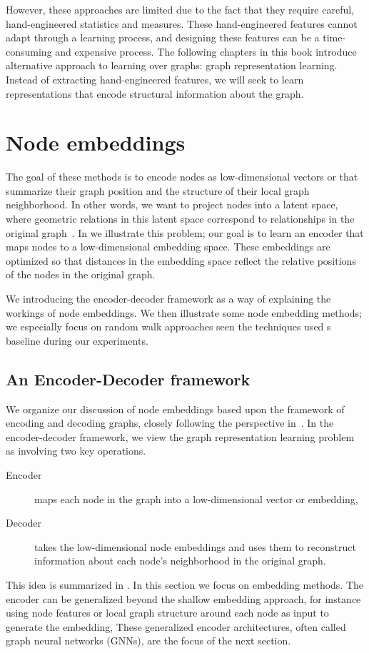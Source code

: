 However, these approaches are limited due to the fact that they require careful, hand-engineered statistics and measures. These hand-engineered features cannot adapt through a learning process, and designing these features can be a time-consuming and expensive process. The following chapters in this book introduce alternative approach to learning over graphs: graph representation learning. Instead of extracting hand-engineered features, we will seek to learn representations that encode structural information about the graph.

\section{Node embeddings}\label{sec:shallowEmbeddings}
The goal of these methods is to encode nodes as low-dimensional vectors or  that summarize their graph position and the structure of their local graph neighborhood. In other words, we want to project nodes into a latent space, where geometric relations in this latent space correspond to relationships in the original graph~\cite{Hoff2002latentSpaceApproachesSocialNetworkAnalysis}. In  we illustrate this problem; our goal is to learn an encoder that maps nodes to a low-dimensional embedding space. These embeddings are optimized so that distances in the embedding space reflect the relative positions of the nodes in the original graph. 

We introducing the encoder-decoder framework as a way of explaining the workings of node embeddings. We then illustrate some node embedding methods; we especially focus on random walk approaches seen the techniques used s baseline during our experiments.

\subsection{An Encoder-Decoder framework}
We organize our discussion of node embeddings based upon the framework of encoding and decoding graphs, closely following the perspective in~\cite{Hamilton2020GraphRL}. In the encoder-decoder framework, we view the graph representation learning problem as involving two key operations. 
\begin{description}
    \item[Encoder] maps each node in the graph into a low-dimensional vector or embedding,
    \item[Decoder] takes the low-dimensional node embeddings and uses them to reconstruct information about each node's neighborhood in the original graph.
\end{description}
This idea is summarized in .
In this section we focus on  embedding methods. The encoder can be generalized beyond the shallow embedding approach, for instance using node features or local graph structure around each node as input to generate the embedding, These generalized encoder architectures, often called graph neural networks (GNNs), are the focus of the next section.

